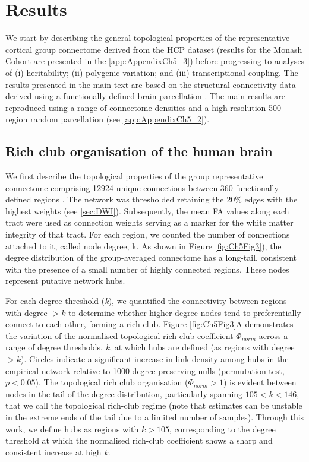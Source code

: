 \section{Results}

We start by describing the general topological properties of the representative cortical group connectome derived from the HCP dataset (results for the Monash Cohort are presented in the \ref{app:AppendixCh5_3}) before progressing to analyses of (i) heritability; (ii) polygenic variation; and (iii) transcriptional coupling. The results presented in the main text are based on the structural connectivity data derived using a functionally-defined brain parcellation \citep{Glasser2016}. The main results are reproduced using a range of connectome densities and a high resolution 500-region random parcellation (see \ref{app:AppendixCh5_2}).

\subsection{Rich club organisation of the human brain}

We first describe the topological properties of the group representative connectome comprising \num{12924} unique connections between 360 functionally defined regions \citep{Glasser2016}. The network was thresholded retaining the $20\%$ edges with the highest weights (see \ref{sec:DWI}). Subsequently, the mean FA values along each tract were used as connection weights serving as a marker for the white matter integrity of that tract. For each region, we counted the number of connections attached to it, called node degree, k. As shown in Figure \ref{fig:Ch5Fig3}), the degree distribution of the group-averaged connectome has a long-tail, consistent with the presence of a small number of highly connected regions. These nodes represent putative network hubs.

For each degree threshold (\textit{k}), we quantified the connectivity between regions with degree $> k$ to determine whether higher degree nodes tend to preferentially connect to each other, forming a rich-club. Figure \ref{fig:Ch5Fig3}A demonstrates the variation of the normalised topological rich club coefficient $\Phi_{norm}$ across a range of degree thresholds, \textit{k}, at which hubs are defined (as regions with degree $> k$). Circles indicate a significant increase in link density among hubs in the empirical network relative to 1000 degree-preserving nulls (permutation test, $p < 0.05$). The topological rich club organisation ($\Phi_{norm} >1$) is evident between nodes in the tail of the degree distribution, particularly spanning $105< k <146$, that we call the topological rich-club regime (note that estimates can be unstable in the extreme ends of the tail due to a limited number of samples). Through this work, we define hubs as regions with $k > 105$, corresponding to the degree threshold at which the normalised rich-club coefficient shows a sharp and consistent increase at high \textit{k}.

